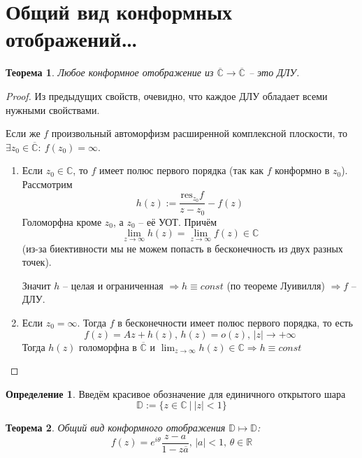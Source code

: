 \documentclass[a4paper,12pt]{article}
\theoremstyle{plain}
\newtheorem{theorem}{Теорема}[section]
\theoremstyle{definition}
\newtheorem{definition}{Определение}[section]
\theoremstyle{remark}
\begin{document}
\section{Общий вид конформных отображений\dots}
\begin{theorem}
	Любое конформное отображение из $\overline{\mathbb{C}} \to \overline{\mathbb{C}}$ -- это ДЛУ.
\end{theorem}

\begin{proof}
	Из предыдущих свойств, очевидно, что каждое ДЛУ обладает всеми нужными свойствами.

	Если же $f$ произвольный автоморфизм расширенной комплексной плоскости, то $\exists z_0 \in \overline{\mathbb{C}} :\: f(z_0) = \infty$.

	\begin{enumerate}
		\item Если $z_0 \in \mathbb{C}$, то $f$ имеет полюс первого порядка (так как $f$ конформно в $z_0$). Рассмотрим
		      \[
			      h(z) := \frac{\text{res}_{z_0}f}{z - z_0} - f(z)
		      \]
		      Голоморфна кроме $z_0$, а $z_0$ -- её УОТ. Причём
		      \[
			      \lim_{z \to \infty}h(z) = \lim_{z \to \infty}f(z) \in \mathbb{C}
		      \]
		      (из-за биективности мы не можем попасть в бесконечность из двух разных точек).

		      Значит $h$ -- целая и ограниченная $\Rightarrow h \equiv const$ (по теореме Луивилля) $\Rightarrow f$ -- ДЛУ.
		\item Если $z_0 = \infty$. Тогда $f$ в бесконечности имеет полюс первого порядка, то есть
		\[
			f(z) = Az + h(z),\, h(z) = o(z),\, \vert z\vert \to +\infty
		\]
		Тогда $h(z)$ голоморфна в $\overline{\mathbb{C}}$ и $\lim_{z \to \infty} h(z) \in \mathbb{C} \Rightarrow h \equiv const$
	\end{enumerate}
\end{proof}

\begin{definition}
	Введём красивое обозначение для единичного открытого шара
	\[
		\mathbb{D} := \{z \in \mathbb{C} \:\vert\: \vert z\vert < 1\}
	\]
\end{definition}

\begin{theorem}
	Общий вид конформного отображения $\mathbb{D} \mapsto \mathbb{D}$:
	\[
		f(z) = e^{i\theta}\frac{z - a}{1 - z\overline{a}},\, \vert a\vert < 1,\, \theta \in \mathbb{R}
	\]
\end{theorem}
\end{document}
